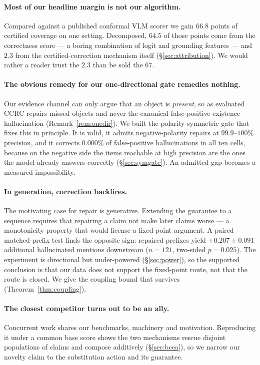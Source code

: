 \documentclass[review,number,doubleblind]{elsarticle}
\theoremstyle{plain}
\theoremstyle{definition}
\theoremstyle{remark}
\begin{document}
\paragraph{Most of our headline margin is not our algorithm.}
Compared against a published conformal VLM scorer we gain $66.8$ points of certified coverage
on one setting. Decomposed, $64.5$ of those points come from the correctness score --- a boring
combination of logit and grounding features --- and $2.3$ from the certified-correction
mechanism itself (\S\ref{sec:attribution}). We would rather a reader trust the $2.3$ than be
sold the $67$.

\paragraph{The obvious remedy for our one-directional gate remedies nothing.}
Our evidence channel can only argue that an object is \emph{present}, so as evaluated CCRC
repairs missed objects and never the canonical false-positive existence hallucination
(Remark~\ref{rem:onedir}). We built the polarity-symmetric gate that fixes this in principle.
It is valid, it admits negative-polarity repairs at $99.9$--$100\%$ precision, and it corrects
$0.000\%$ of false-positive hallucinations in all ten cells, because on the negative side the
items reachable at high precision are the ones the model already answers correctly
(\S\ref{sec:symgate}). An admitted gap becomes a measured impossibility.

\paragraph{In generation, correction backfires.}
The motivating case for repair is generative. Extending the guarantee to a sequence requires
that repairing a claim not make later claims worse --- a monotonicity property that would
license a fixed-point argument. A paired matched-prefix test finds the opposite sign:
repaired prefixes yield $+0.207\pm0.091$ additional hallucinated mentions downstream
($n=121$, two-sided $p=0.025$). The experiment is directional but under-powered
(\S\ref{sec:power}), so the supported conclusion is that our data does not support the
fixed-point route, not that the route is closed. We give the coupling bound that survives
(Theorem~\ref{thm:coupling}).

\paragraph{The closest competitor turns out to be an ally.}
Concurrent work \citep{bcea} shares our benchmarks, machinery and motivation. Reproducing it
under a common base score shows the two mechanisms rescue disjoint populations of claims and
compose additively (\S\ref{sec:bcea}), so we narrow our novelty claim to the substitution
action and its guarantee.
\end{document}
